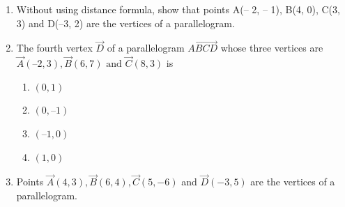 \begin{enumerate}[label=\thesubsection.\arabic*,ref=\thesubsection.\theenumi]
	\solution
		
\item Without using distance formula, show that points A(– 2, – 1), B(4, 0), C(3, 3) and D(–3, 2) are the vertices of a parallelogram.
\label{chapters/11/10/1/9}
\\
\solution

\item The fourth vertex $\vec{D}$ of a parallelogram $\vec{ABCD}$ whose three vertices are
	$\vec{A} (–2, 3), \vec{B} (6, 7)\text { and } \vec{C} (8, 3)$ is
\begin{enumerate}
	\item $(0, 1)$
	\item $(0, –1)$
	\item $ (–1,0)$
	\item$(1, 0)$
\end{enumerate}
\item Points $\vec{A}(4,3), \vec{B}(6,4),\vec{C}(5,-6)$  and  $\vec{D}(-3,5)$ are the vertices of a parallelogram.
\end{enumerate}
